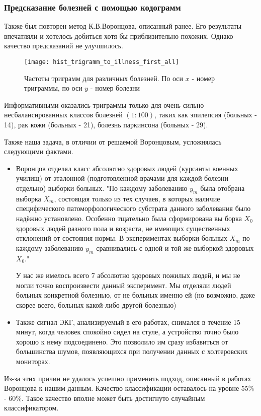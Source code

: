 \subsubsection{Предсказание болезней с помощью кодограмм}

Также был повторен метод К.В.Воронцова, описанный ранее. Его результаты впечатляли и хотелось добиться хотя бы приблизительно похожих. Однако качество предсказаний не улучшилось. 

\begin{figure}[h!]
	\begin{center}
		\texttt{[image: hist\_trigramm\_to\_illness\_first\_all]}
		\caption{Частоты триграмм для различных болезней. По оси $x$ - номер триграммы, по оси $y$ - номер болезни}
		\label{ris:trigramm}
	\end{center}
\end{figure}

Информативными оказались триграммы только для очень сильно несбалансированных классов болезней $(1:100)$, таких как эпилепсия (больных - 14), рак кожи (больных - 21), болезнь паркинсона (больных - 29).

Также наша задача, в отличии от решаемой Воронцовым, усложнялась следующими фактами.
\begin{itemize}
	\item Воронцов отделял класс абсолютно здоровых людей (курсанты военных училищ) от эталонной (подготовленной врачами для каждой болезни отдельно) выборки больных. "По каждому заболеванию $y_m$ была отобрана выборка $X_m$, состоящая только из тех случаев, в которых наличие специфического патоморфологического субстрата данного заболевания было надёжно установлено. Особенно тщательно была сформирована вы	борка $X_0$ здоровых людей разного пола и возраста, не имеющих существенных отклонений от состояния нормы. В экспериментах выборки больных $X_m$ по каждому заболеванию $y_m$ сравнивались с одной и той же выборкой здоровых $X_0$."
	
	У нас же имелось всего 7 абсолютно здоровых пожилых людей, и мы не могли точно воспроизвести данный эксперимент. Мы отделяли людей больных конкретной болезнью, от не больных именно ей (но возможно, даже скорее всего, больных какой-либо другой болезнью)
	\item Также сигнал ЭКГ, анализируемый в его работах, снимался в течение 15 минут, когда человек спокойно сидел на стуле, а устройство точно было хорошо к нему подсоединено. Это позволило им сразу избавиться от большинства шумов, появляющихся при получении данных с холтеровских мониторах. 
\end{itemize}

Из-за этих причин не удалось успешно применить подход, описанный в работах Воронцова к нашим данным. Качество классификации оставалось на уровне 55\% - 60\%. Такое качество вполне может быть достигнуто случайным классификатором.


